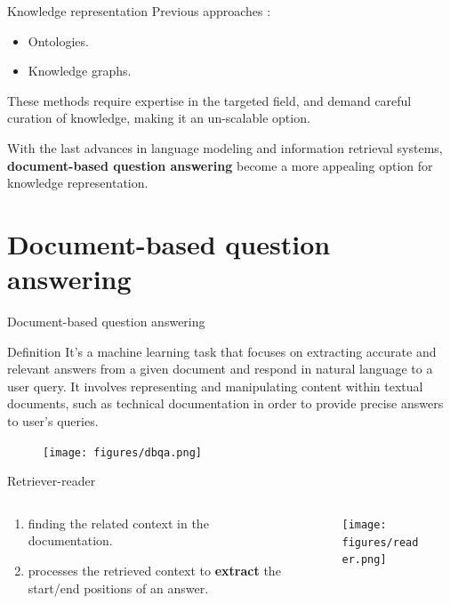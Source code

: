 \documentclass{beamer}
\begin{document}
\begin{frame}{Knowledge representation}
    Previous approaches :
    \begin{itemize}
        \item Ontologies.
        \item Knowledge graphs.
    \end{itemize}
    \begin{alertblock}{}
    These methods require expertise in the targeted field, and demand careful curation of knowledge, making it an un-scalable option. 
    \end{alertblock}

    \begin{exampleblock}{}
    With the last advances in language modeling and information retrieval systems, \textbf{document-based question answering} become a more appealing option for knowledge representation.
    \end{exampleblock}
\end{frame}

\section{Document-based question answering}
\begin{frame}{Document-based question answering}
    \begin{block}{Definition}
        It's a machine learning task that focuses on extracting accurate and relevant answers from a given document and respond in natural language to a user query.
        It involves representing and manipulating content within textual documents, such as technical documentation in order to provide precise answers to user's queries.
    \end{block}

    \begin{figure}[h]
        \centering
        \texttt{[image: figures/dbqa.png]}
    \end{figure}
\end{frame}

\begin{frame}{Retriever-reader}
    \begin{columns}
        \begin{column}{0.55\textwidth}
            \begin{enumerate}
                \item finding the related context in the documentation.
                \item processes the retrieved context to \textbf{extract} the start/end positions of an answer.
            \end{enumerate}
        \end{column}
        
        \begin{column}{0.45\textwidth}
            \begin{figure}[htbp]
                \centering
                \texttt{[image: figures/reader.png]}
            \end{figure}
        \end{column}
    \end{columns}
\end{frame}
\end{document}
